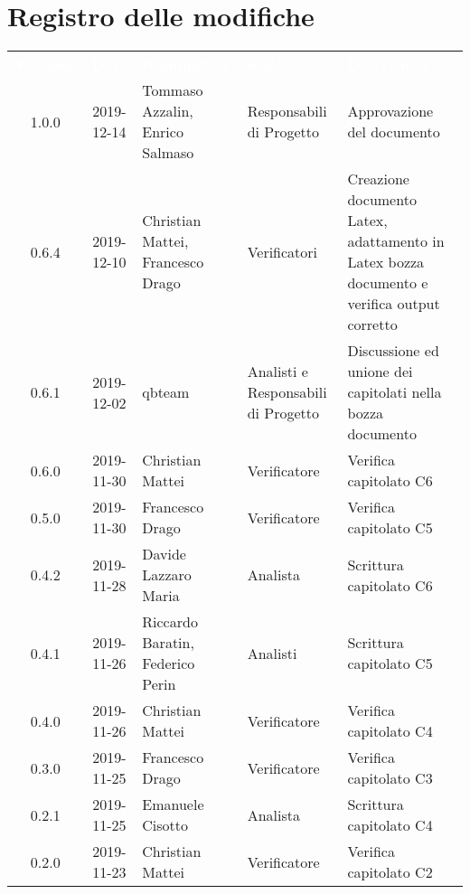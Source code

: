 \section*{Registro delle modifiche}
{
\renewcommand{\arraystretch}{1.5}
\centering
\begin{longtable}{ c c  C{4cm}  C{3cm} C{4cm}}
\textcolor{white}{\textbf{Versione}} & \textcolor{white}{\textbf{Data}} & \textcolor{white}{\textbf{Nominativo}} & \textcolor{white}{\textbf{Ruolo}} & \textcolor{white}{\textbf{Descrizione}}\\	

1.0.0 & 2019-12-14 & Tommaso Azzalin, Enrico Salmaso & Responsabili di Progetto & Approvazione del documento \\	
		
0.6.4 & 2019-12-10 & Christian Mattei, Francesco Drago & Verificatori & Creazione documento Latex, adattamento in Latex bozza documento e verifica output corretto\\

0.6.1 & 2019-12-02 & qbteam & Analisti e Responsabili di Progetto & Discussione ed unione dei capitolati nella bozza documento \\

0.6.0 & 2019-11-30 & Christian Mattei & Verificatore & Verifica capitolato C6 \\

0.5.0 & 2019-11-30 & Francesco Drago & Verificatore & Verifica capitolato C5 \\

0.4.2 & 2019-11-28 & Davide Lazzaro Maria & Analista & Scrittura capitolato C6 \\

0.4.1 & 2019-11-26 & Riccardo Baratin, Federico Perin & Analisti & Scrittura capitolato C5 \\

0.4.0 & 2019-11-26 & Christian Mattei & Verificatore & Verifica capitolato C4 \\

0.3.0 & 2019-11-25 & Francesco Drago & Verificatore & Verifica capitolato C3 \\

0.2.1 & 2019-11-25 & Emanuele Cisotto & Analista & Scrittura capitolato C4 \\

0.2.0 & 2019-11-23 & Christian Mattei & Verificatore & Verifica capitolato C2 \\


\end{longtable}}
